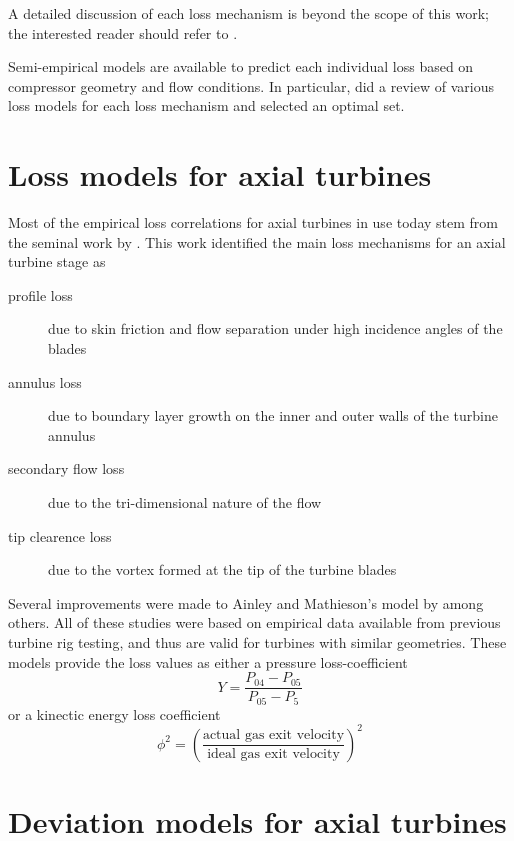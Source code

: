 \documentclass[tcc]{subfiles}
\begin{document}
A detailed discussion of each loss mechanism is beyond the scope of this work; 
the interested reader should refer to \textcite{Cumpsty2004}. 

Semi-empirical models are available to predict each individual loss based on compressor geometry and flow conditions. 
In particular, \textcite{Oh1997} did a review of various loss models for each loss mechanism and selected an optimal set.

\section{Loss models for axial turbines}

Most of the empirical loss correlations for axial turbines in use today stem from the seminal work by \textcite{Ainley1951}. This work identified the main loss mechanisms for an axial turbine stage as 
\begin{description}
    \item[profile loss] due to skin friction and flow separation under high incidence angles of the blades
    \item[annulus loss] due to boundary layer growth on the inner and outer walls of the turbine annulus
    \item[secondary flow loss] due to the tri-dimensional nature of the flow
    \item[tip clearence loss] due to the vortex formed at the tip of the turbine blades
\end{description}

Several improvements were made to Ainley and Mathieson's model by \textcite{Mukhtarov196, Dunham1970, Kacker1982, Moustapha1990, Benner1995} among others\cite{Persson2015}. All of these studies were based on empirical data available from previous turbine rig testing, and thus are valid for turbines with similar geometries.
These models provide the loss values as either a pressure loss-coefficient
\begin{equation}
    Y = \frac{P_{04}-P_{05}}{P_{05}-P_5}
\end{equation}
or a kinectic energy loss coefficient
\begin{equation}
    \phi^2 = \left(\frac{\text{actual gas exit velocity}}
                        {\text{ideal gas exit velocity}}\right)^2
\end{equation}

\section{Deviation models for axial turbines}
\end{document}
